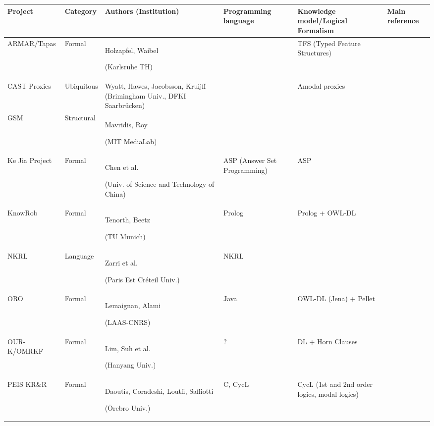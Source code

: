 \documentclass{IEEEtran}
\begin{document}
\begin{table*}\scriptsize
\begin{center}

\begin{tabular}{p{2.2cm}p{1.6cm}p{4cm}p{2.4cm}p{3.4cm}p{1.5cm}}
\toprule
{\bf Project} & {\bf Category} & {\bf Authors (Institution)} & {\bf Programming language} & {\bf Knowledge model/Logical Formalism} & Main reference \\
\midrule
ARMAR/Tapas & Formal & Holzapfel, Waibel \par (Karlsruhe TH) & & TFS (Typed Feature Structures) & \cite{Holzapfel2008}\\
CAST Proxies & Ubiquitous & Wyatt, Hawes, Jacobsson, Kruijff (Brimingham Univ.,
DFKI Saarbrücken) & & Amodal proxies & \cite{jacobsson2008crossmodal} \\
GSM & Structural & Mavridis, Roy \par (MIT MediaLab) & & & \cite{Mavridis2006} \\
Ke Jia Project & Formal & Chen et al. \par (Univ. of Science and Technology of China) & ASP (Answer Set Programming) & ASP & \cite{Chen2010} \\
{\sc KnowRob} & Formal & Tenorth, Beetz \par (TU Munich) & {\sc Prolog} & {\sc Prolog} + OWL-DL &  \cite{Tenorth2009a} \\
NKRL & Language & Zarri et al. \par (Paris Est Créteil Univ.) & NKRL & & \cite{Sabri2011} \\
ORO & Formal & Lemaignan, Alami \par (LAAS-CNRS) & {\sc Java} & OWL-DL ({\sc Jena}) + {\sc Pellet} & \cite{Lemaignan2010} \\
OUR-K/OMRKF & Formal & Lim, Suh et al. \par (Hanyang Univ.) & ? & DL + Horn Clauses &  \cite{Lim2011, Suh2007} \\
PEIS KR\&R & Formal & Daoutis, Coradeshi, Loutfi, Saffiotti \par (Örebro Univ.) & {\sc C}, {\sc CycL} & CycL (1st and 2nd order logics, modal logics) & \cite{Daoutis2009} \\


\end{tabular}
\end{center}
\end{table*}
\end{document}
